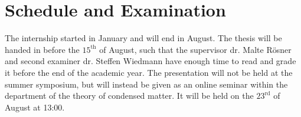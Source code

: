 \documentclass{article}
\begin{document}
\section*{Schedule and Examination}

The internship started in January and will end in August. The thesis will be handed in before the $15^\mathrm{th}$ of August, such that the supervisor dr. Malte Rösner and second examiner dr. Steffen Wiedmann have enough time to read and grade it before the end of the academic year. The presentation will not be held at the summer symposium, but will instead be given as an online seminar within the department of the theory of condensed matter. It will be held on the $23^\mathrm{rd}$ of August at 13:00.
\end{document}
